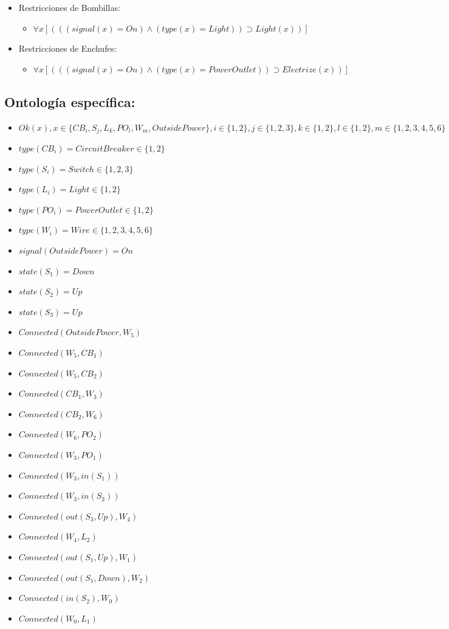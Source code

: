 \documentclass[10pt, a4paper,spanish]{article}
\begin{document}
\begin{itemize}
				\item Restricciones de Bombillas:
				\begin{itemize}
					\item$ \forall x [(((signal(x) = On) \land (type(x) = Light) )  \supset Light(x))] $
				\end{itemize}

				\item Restricciones de Enchufes:
				\begin{itemize}
					\item$ \forall x [(((signal(x) = On) \land (type(x) = PowerOutlet) )  \supset Electrize(x))] $
				\end{itemize}
			\end{itemize}

		\subsection{Ontología específica:}

			\begin{itemize}
				\item $ Ok(x),  x \in \{CB_i, S_j, L_k, PO_l, W_m, OutsidePower\}, i \in \{1,2\}, j \in \{1,2,3\},k \in \{1,2\},l \in \{1,2\},m \in \{1,2,3,4,5,6\}$
				\item $ type(CB_i) = CircuitBreaker \in \{1,2\} $
				\item $ type(S_i) = Switch \in \{1,2, 3\} $
				\item $ type(L_i) = Light \in \{1,2\} $
				\item $ type(PO_i) = PowerOutlet \in \{1,2\} $
				\item $ type(W_i) = Wire \in \{1,2, 3, 4, 5, 6\} $
				\item $ signal(OutsidePower) = On $
				\item $ state(S_1) = Down $
				\item $ state(S_2) = Up $
				\item $ state(S_3) = Up $
				\item $ Connected(OutsidePower, W_5)$
				\item $ Connected(W_5, CB_1)$
				\item $ Connected(W_5, CB_2)$
				\item $ Connected(CB_1, W_3)$
				\item $ Connected(CB_2, W_6)$
				\item $ Connected(W_6, PO_2)$
				\item $ Connected(W_3, PO_1)$
				\item $ Connected(W_3, in(S_1))$
				\item $ Connected(W_3, in(S_3))$
				\item $ Connected(out(S_3, Up), W_4)$
				\item $ Connected(W_4, L_2)$
				\item $ Connected(out(S_1, Up), W_1)$
				\item $ Connected(out(S_1, Down), W_2)$
				\item $ Connected(in(S_2), W_0)$
				\item $ Connected(W_0, L_1)$
			\end{itemize}
\end{document}
